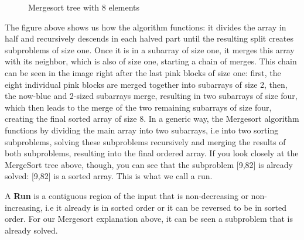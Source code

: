 \documentclass[a4paper]{article}
\theoremstyle{plain}
\theoremstyle{definition}
\begin{document}
\begin{figure}[h]
\begin{center}
\caption{Mergesort tree with 8 elements}
\end{center}
\end{figure}

\noindent The figure above shows us how the algorithm functions: it divides the array in half and
recursively descends in each halved part until the resulting split creates subproblems of size one. Once
it is in a subarray of size one, it merges this array with its neighbor, which is also of size one, starting a chain of merges.
This chain can be seen in the image right after the last pink blocks of size one: first, the eight individual pink blocks are merged together 
into subarrays of size 2, then, the now-blue and 2-sized subarrays merge, resulting in two subarrays of size four, which then
leads to the merge of the two remaining subarrays of size four, creating the final sorted array of size 8.
In a generic way, the Mergesort algorithm functions by dividing the main array into two subarrays, i.e into two sorting subproblems, solving these subproblems recursively
and merging the results of both subproblems, resulting into the final ordered array.
If you look closely at the MergeSort tree above, though, you can see that the subproblem
[9,82] is already solved: [9,82] is a sorted array. This is what we call a run.


 A \textbf{Run} is a contiguous region of the input that is non-decreasing or non-increasing, i.e it already is in sorted order or it can be reversed to be in sorted order. For
our Mergesort explanation above, it can be seen a subproblem that is already solved.
\end{document}
